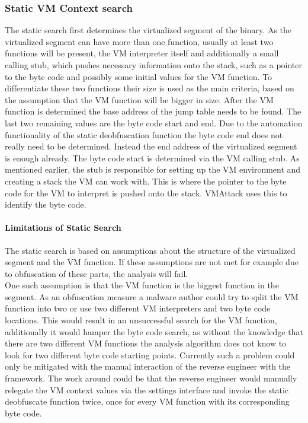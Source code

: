 \documentclass[10pt,twoside,a4paper,bibliography=totoc]{scrbook}
\begin{document}
\subsubsection{Static VM Context search}
The static search first determines the virtualized segment of the binary. 
As the virtualized segment can have more than one function, usually at least two functions will be present, the VM interpreter itself and additionally a small calling stub, which pushes necessary information onto the stack, such as a pointer to the byte code and possibly some initial values for the VM function. 
To differentiate these two functions their size is used as the main criteria, based on the assumption that the VM function will be bigger in size. 
After the VM function is determined the base address of the jump table needs to be found.
The last two remaining values are the byte code start and end. Due to the automation functionality of the static deobfuscation function the byte code end does not really need to be determined. Instead the end address of the virtualized segment is enough already. 
The byte code start is determined via the VM calling stub. As mentioned earlier, the stub is responsible for setting up the VM environment and creating a stack the VM can work with. This is where the pointer to the byte code for the VM to interpret is pushed onto the stack. VMAttack uses this to identify the byte code.

\paragraph*{Limitations of Static Search} The static search is based on assumptions about the structure of the virtualized segment and the VM function. If these assumptions are not met for example due to obfuscation of these parts, the analysis will fail.\\
One such assumption is that the VM function is the biggest function in the segment. As an obfuscation measure a malware author could try to split the VM function into two or use two different VM interpreters and two byte code locations.
This would result in an unsuccessful search for the VM function, additionally it would hamper the byte code search, as without the knowledge that there are two different VM functions the analysis algorithm does not know to look for two different byte code starting points.
Currently such a problem could only be mitigated with the manual interaction of the reverse engineer with the framework. 
The work around could be that the reverse engineer would manually relegate the VM context values via the settings interface and invoke the static deobfuscate function twice, once for every VM function with its corresponding byte code.
\end{document}
